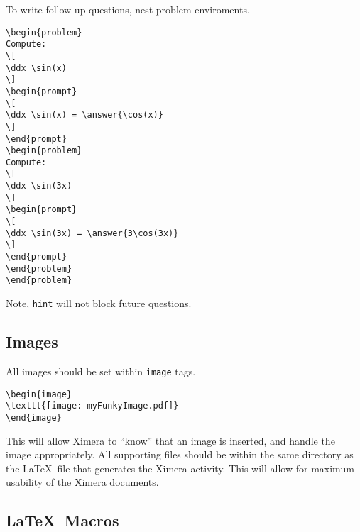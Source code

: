 \documentclass{ximera}
\begin{document}
To write follow up questions, nest problem enviroments.
\begin{verbatim}
\begin{problem}
Compute:
\[
\ddx \sin(x)
\]
\begin{prompt}
\[
\ddx \sin(x) = \answer{\cos(x)}
\]
\end{prompt}
\begin{problem}
Compute:
\[
\ddx \sin(3x)
\]
\begin{prompt}
\[
\ddx \sin(3x) = \answer{3\cos(3x)}
\]
\end{prompt}
\end{problem}
\end{problem}
\end{verbatim}
Note, \verb|hint| will not block future questions.





\subsection*{Images}

All images should be set within \verb|image| tags.
\begin{verbatim}
\begin{image}
\texttt{[image: myFunkyImage.pdf]}
\end{image}
\end{verbatim}
This will allow Ximera to ``know'' that an image is inserted, and
handle the image appropriately. All supporting files should be within
the same directory as the \LaTeX\ file that generates the Ximera
activity. This will allow for maximum usability of the Ximera
documents.

\subsection*{\LaTeX\ Macros}
\end{document}
